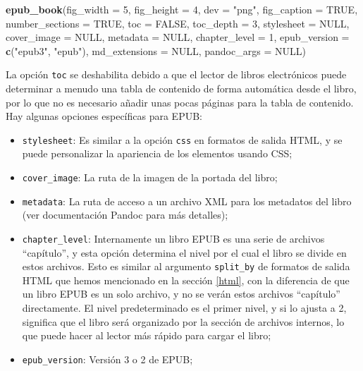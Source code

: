 \documentclass[12pt,]{krantz}
\makeatletter
\newenvironment{Shaded}{\begin{snugshade}}{\end{snugshade}}
\newcommand{\KeywordTok}[1]{\textcolor[rgb]{0.13,0.29,0.53}{\textbf{{#1}}}}
\newcommand{\DataTypeTok}[1]{\textcolor[rgb]{0.13,0.29,0.53}{{#1}}}
\newcommand{\DecValTok}[1]{\textcolor[rgb]{0.00,0.00,0.81}{{#1}}}
\newcommand{\StringTok}[1]{\textcolor[rgb]{0.31,0.60,0.02}{{#1}}}
\newcommand{\OtherTok}[1]{\textcolor[rgb]{0.56,0.35,0.01}{{#1}}}
\newcommand{\NormalTok}[1]{{#1}}
\providecommand{\tightlist}{%
  \setlength{\itemsep}{0pt}\setlength{\parskip}{0pt}}
\newenvironment{kframe}{%
\medskip{}
\setlength{\fboxsep}{.8em}
 \def\at@end@of@kframe{}%
 \ifinner\ifhmode%
  \def\at@end@of@kframe{\end{minipage}}%
  \begin{minipage}{\columnwidth}%
 \fi\fi%
 \def\FrameCommand##1{\hskip\@totalleftmargin \hskip-\fboxsep
 \colorbox{shadecolor}{##1}\hskip-\fboxsep
     \hskip-\linewidth \hskip-\@totalleftmargin \hskip\columnwidth}%
 \MakeFramed {\advance\hsize-\width
   \@totalleftmargin\z@ \linewidth\hsize
   \@setminipage}}%
 {\par\unskip\endMakeFramed%
 \at@end@of@kframe}
\renewenvironment{Shaded}{\begin{kframe}}{\end{kframe}}
\theoremstyle{definition}
\theoremstyle{definition}
\theoremstyle{remark}
\makeatother
\begin{document}
\begin{Shaded}
\begin{Highlighting}[]
\KeywordTok{epub_book}\NormalTok{(}\DataTypeTok{fig_width =} \DecValTok{5}\NormalTok{, }\DataTypeTok{fig_height =} \DecValTok{4}\NormalTok{, }\DataTypeTok{dev =} \StringTok{"png"}\NormalTok{, }\DataTypeTok{fig_caption =} \OtherTok{TRUE}\NormalTok{, }
  \DataTypeTok{number_sections =} \OtherTok{TRUE}\NormalTok{, }\DataTypeTok{toc =} \OtherTok{FALSE}\NormalTok{, }\DataTypeTok{toc_depth =} \DecValTok{3}\NormalTok{, }
  \DataTypeTok{stylesheet =} \OtherTok{NULL}\NormalTok{, }\DataTypeTok{cover_image =} \OtherTok{NULL}\NormalTok{, }\DataTypeTok{metadata =} \OtherTok{NULL}\NormalTok{, }
  \DataTypeTok{chapter_level =} \DecValTok{1}\NormalTok{, }\DataTypeTok{epub_version =} \KeywordTok{c}\NormalTok{(}\StringTok{"epub3"}\NormalTok{, }\StringTok{"epub"}\NormalTok{), }
  \DataTypeTok{md_extensions =} \OtherTok{NULL}\NormalTok{, }\DataTypeTok{pandoc_args =} \OtherTok{NULL}\NormalTok{)}
\end{Highlighting}
\end{Shaded}

La opción \texttt{toc} se deshabilita debido a que el lector de libros
electrónicos puede determinar a menudo una tabla de contenido de forma
automática desde el libro, por lo que no es necesario añadir unas pocas
páginas para la tabla de contenido. Hay algunas opciones específicas
para EPUB:

\begin{itemize}
\tightlist
\item
  \texttt{stylesheet}: Es similar a la opción \texttt{css} en formatos
  de salida HTML, y se puede personalizar la apariencia de los elementos
  usando CSS;
\item
  \texttt{cover\_image}: La ruta de la imagen de la portada del libro;
\item
  \texttt{metadata}: La ruta de acceso a un archivo XML para los
  metadatos del libro (ver documentación Pandoc para más detalles);
\item
  \texttt{chapter\_level}: Internamente un libro EPUB es una serie de
  archivos ``capítulo'', y esta opción determina el nivel por el cual el
  libro se divide en estos archivos. Esto es similar al argumento
  \texttt{split\_by} de formatos de salida HTML que hemos mencionado en
  la sección \ref{html}, con la diferencia de que un libro EPUB es un
  solo archivo, y no se verán estos archivos ``capítulo'' directamente.
  El nivel predeterminado es el primer nivel, y si lo ajusta a 2,
  significa que el libro será organizado por la sección de archivos
  internos, lo que puede hacer al lector más rápido para cargar el
  libro;
\item
  \texttt{epub\_version}: Versión 3 o 2 de EPUB;
\end{itemize}
\end{document}
